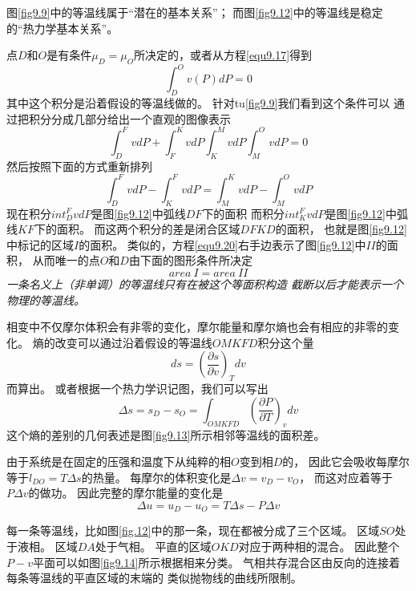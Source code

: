 图\ref{fig9.9}中的等温线属于“潜在的基本关系”；
而图\ref{fig9.12}中的等温线是稳定的“热力学基本关系”。

点$D$和$O$是有条件$\mu_D=\mu_O$所决定的，或者从方程\eqref{equ9.17}得到
\begin{equation}
\label{equ9.18}
\int_D^Ov(P)dP=0
\end{equation}
其中这个积分是沿着假设的等温线做的。
针对tu\ref{fig9.9}我们看到这个条件可以
通过把积分分成几部分给出一个直观的图像表示
\begin{equation}
\label{equ9.19}
\int_D^FvdP+\int_F^KvdP\int_K^MvdP\int_M^OvdP=0
\end{equation}
然后按照下面的方式重新排列
\begin{equation}
\label{equ9.20}
\int_D^FvdP-\int_K^FvdP=\int_M^KvdP-\int_M^OvdP
\end{equation}
现在积分$int_D^FvdP$是图\ref{fig9.12}中弧线$DF$下的面积
而积分$int_K^FvdP$是图\ref{fig9.12}中弧线$KF$下的面积。
而这两个积分的差是闭合区域$DFKD$的面积，
也就是图\ref{fig9.12}中标记的区域$I$的面积。
类似的，方程\eqref{equ9.20}右手边表示了图\ref{fig9.12}中$II$的面积，
从而唯一的点$O$和$D$由下面的图形条件所决定
\begin{equation}
\label{equ9.21}
area~I= area~II
\end{equation}
{\it 一条名义上（非单调）的等温线只有在被这个等面积构造
截断以后才能表示一个物理的等温线。}

相变中不仅摩尔体积会有非零的变化，摩尔能量和摩尔熵也会有相应的非零的变化。
熵的改变可以通过沿着假设的等温线$OMKFD$积分这个量
\begin{equation}
\label{equ9.22}
ds=\left(\frac{\partial s}{\partial v}\right)_Tdv
\end{equation}
而算出。
或者根据一个热力学识记图，我们可以写出
\begin{equation}
\label{equ9.23}
\Delta s=s_D-s_O=
\int_{OMKFD}\left(\frac{\partial P}{\partial T}\right)_vdv
\end{equation}
这个熵的差别的几何表述是图\ref{fig9.13}所示相邻等温线的面积差。

由于系统是在固定的压强和温度下从纯粹的相$O$变到相$D$的，
因此它会吸收每摩尔等于$l_{DO}=T\Delta s$的热量。
每摩尔的体积变化是$\Delta v=v_D-v_O$，
而这对应着等于$P\Delta v$的做功。
因此完整的摩尔能量的变化是
\begin{equation}
\label{equ9.24}
\Delta u=u_D-u_O=T\Delta s-P\Delta v
\end{equation}

每一条等温线，比如图\ref{fig.12}中的那一条，现在都被分成了三个区域。
区域$SO$处于液相。
区域$DA$处于气相。
平直的区域$OKD$对应于两种相的混合。
因此整个$P-v$平面可以如图\ref{fig9.14}所示根据相来分类。
气相共存混合区由反向的连接着每条等温线的平直区域的末端的
类似抛物线的曲线所限制。

